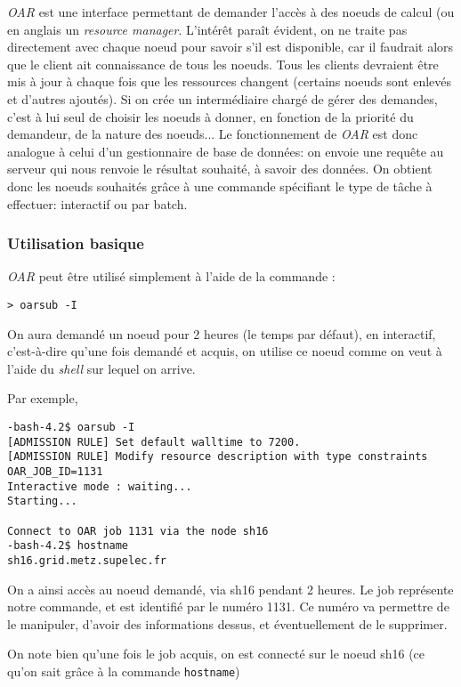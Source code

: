 \par \emph{OAR} est une interface permettant de demander l'accès à des noeuds de calcul (ou en anglais un \emph{resource manager}. L'intérêt paraît évident, on ne traite pas directement avec chaque noeud pour savoir s'il est disponible, car il faudrait alors que le client ait connaissance de tous les noeuds. Tous les clients devraient être mis à jour à chaque fois que les ressources changent (certains noeuds sont enlevés et d'autres ajoutés). Si on crée un intermédiaire chargé de gérer des demandes, c'est à lui seul de choisir les noeuds à donner, en fonction de la priorité du demandeur, de la nature des noeuds...
Le fonctionnement de \emph{OAR} est donc analogue à celui d'un gestionnaire de base de données: on envoie une requête au serveur qui nous renvoie le résultat souhaité, à savoir des données. On obtient donc les noeuds souhaités grâce à une commande spécifiant le type de tâche à effectuer: interactif ou par batch.


\subsubsection{Utilisation basique}
\label{subsec:utilisation-basique}

\par \emph{OAR} peut être utilisé simplement à l'aide de la commande :
\begin{verbatim}
> oarsub -I
\end{verbatim}

\par On aura demandé un noeud pour 2 heures (le temps par défaut), en interactif, c'est-à-dire qu'une fois demandé et acquis, on utilise ce noeud comme on veut à l'aide du \emph{shell} sur lequel on arrive.

\par Par exemple, 
\begin{verbatim}
-bash-4.2$ oarsub -I
[ADMISSION RULE] Set default walltime to 7200.
[ADMISSION RULE] Modify resource description with type constraints
OAR_JOB_ID=1131
Interactive mode : waiting...
Starting...

Connect to OAR job 1131 via the node sh16
-bash-4.2$ hostname
sh16.grid.metz.supelec.fr
\end{verbatim}
\par On a ainsi accès au noeud demandé, via sh16 pendant 2 heures. Le job représente notre commande, et est identifié par le numéro 1131. Ce numéro va permettre de le manipuler, d'avoir des informations dessus, et éventuellement de le supprimer.
\par On note bien qu'une fois le job acquis, on est connecté sur le noeud sh16 (ce qu'on sait grâce à la commande \texttt{hostname})

